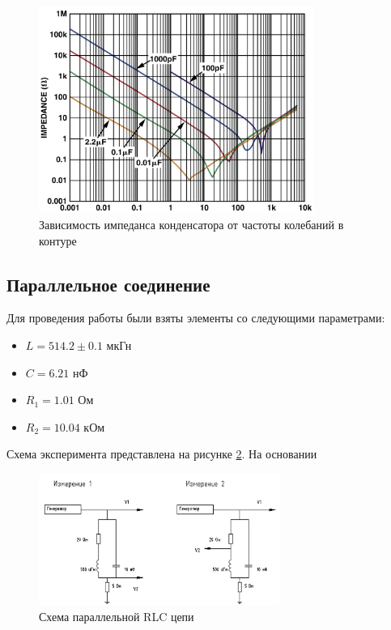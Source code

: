 \documentclass[a4paper, 12pt]{article}
\begin{document}
\begin{figure}[h!]
	\centering
	\includegraphics[width=0.8\textwidth]{Graphic}
	\caption{Зависимость импеданса конденсатора от частоты колебаний в контуре}
	\label{fig:imp}
\end{figure}

\subsection{Параллельное соединение}

Для проведения работы были взяты элементы со следующими параметрами:

\begin{itemize}
	\item $L = 514.2 \pm 0.1$ мкГн
	
	\item $C = 6.21$ нФ
	
	\item $R_1 = 1.01$ Ом
	
	\item $R_2 = 10.04$ кОм
\end{itemize}

Схема эксперимента представлена на рисунке \ref{fig:parallel}. На основании

\begin{figure}[h!]
	\centering
	\includegraphics[width=0.7\textwidth]{Scheme_parallel}
	\caption{Схема параллельной RLC цепи}
	\label{fig:parallel}
\end{figure}
\end{document}

